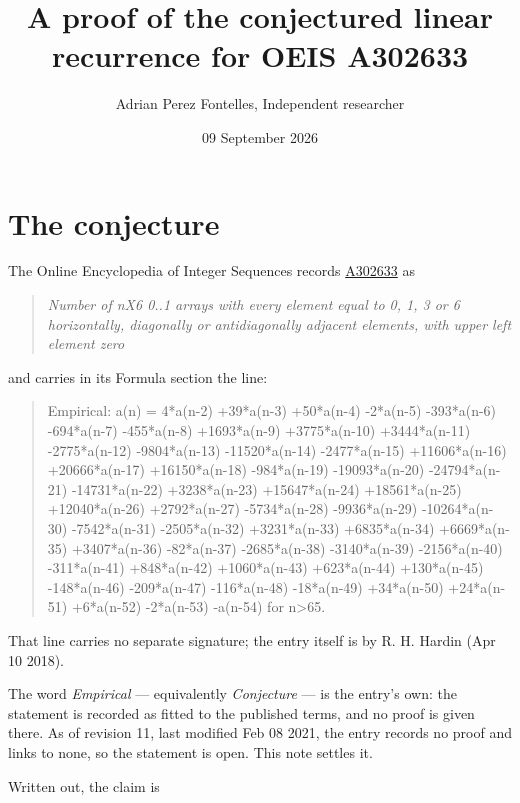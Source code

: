 \documentclass[11pt]{article}
\title{A proof of the conjectured linear recurrence for OEIS A302633}
\author{Adrian Perez Fontelles, Independent researcher}
\date{09 September 2026}
\theoremstyle{definition}
\begin{document}
\maketitle
\section{The conjecture}

The Online Encyclopedia of Integer Sequences records \href{https://oeis.org/A302633}{A302633} as

\begin{quote}\itshape Number of nX6 0..1 arrays with every element equal to 0, 1, 3 or 6 horizontally, diagonally or antidiagonally adjacent elements, with upper left element zero\end{quote}

and carries in its Formula section the line:

\begin{quote}\ttfamily Empirical: a(n) = 4*a(n-2) +39*a(n-3) +50*a(n-4) -2*a(n-5) -393*a(n-6) -694*a(n-7) -455*a(n-8) +1693*a(n-9) +3775*a(n-10) +3444*a(n-11) -2775*a(n-12) -9804*a(n-13) -11520*a(n-14) -2477*a(n-15) +11606*a(n-16) +20666*a(n-17) +16150*a(n-18) -984*a(n-19) -19093*a(n-20) -24794*a(n-21) -14731*a(n-22) +3238*a(n-23) +15647*a(n-24) +18561*a(n-25) +12040*a(n-26) +2792*a(n-27) -5734*a(n-28) -9936*a(n-29) -10264*a(n-30) -7542*a(n-31) -2505*a(n-32) +3231*a(n-33) +6835*a(n-34) +6669*a(n-35) +3407*a(n-36) -82*a(n-37) -2685*a(n-38) -3140*a(n-39) -2156*a(n-40) -311*a(n-41) +848*a(n-42) +1060*a(n-43) +623*a(n-44) +130*a(n-45) -148*a(n-46) -209*a(n-47) -116*a(n-48) -18*a(n-49) +34*a(n-50) +24*a(n-51) +6*a(n-52) -2*a(n-53) -a(n-54) for n>65.\end{quote}

That line carries no separate signature; the entry itself is by R. H. Hardin (Apr 10 2018).

The word {\itshape Empirical} --- equivalently {\itshape Conjecture} --- is the entry's own: the statement is recorded as fitted to the published terms, and no proof is given there. As of revision 11, last modified Feb 08 2021, the entry records no proof and links to none, so the statement is open. This note settles it.

Written out, the claim is
\end{document}
